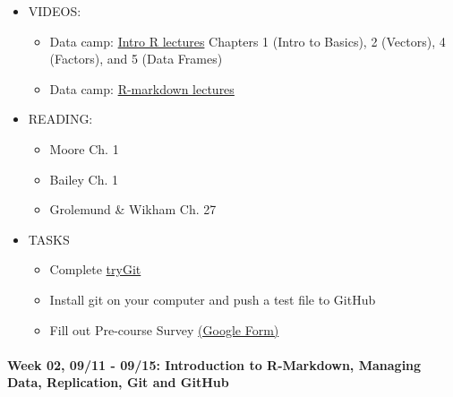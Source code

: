 \documentclass[11pt,]{article}
\providecommand{\tightlist}{%
  \setlength{\itemsep}{0pt}\setlength{\parskip}{0pt}}
\begin{document}
\begin{itemize}
\tightlist
\item
  VIDEOS:

  \begin{itemize}
  \tightlist
  \item
    Data camp:
    \href{https://www.datacamp.com/courses/free-introduction-to-r-beta}{Intro
    R lectures} Chapters 1 (Intro to Basics), 2 (Vectors), 4 (Factors),
    and 5 (Data Frames)
  \item
    Data camp:
    \href{https://www.datacamp.com/courses/reporting-with-r-markdown}{R-markdown
    lectures}
  \end{itemize}
\item
  READING:

  \begin{itemize}
  \tightlist
  \item
    Moore Ch. 1
  \item
    Bailey Ch. 1
  \item
    Grolemund \& Wikham Ch. 27
  \end{itemize}
\item
  TASKS

  \begin{itemize}
  \tightlist
  \item
    Complete \href{https://try.GitHub.io/levels/1/challenges/1}{tryGit}
  \item
    Install git on your computer and push a test file to GitHub
  \item
    Fill out Pre-course Survey
    \href{https://goo.gl/forms/8cw5GZEyl1k3ynBY2}{(Google Form)}
  \end{itemize}
\end{itemize}

\paragraph{Week 02, 09/11 - 09/15: Introduction to R-Markdown, Managing
Data, Replication, Git and
GitHub}\label{week-02-0911---0915-introduction-to-r-markdown-managing-data-replication-git-and-github}
\end{document}
